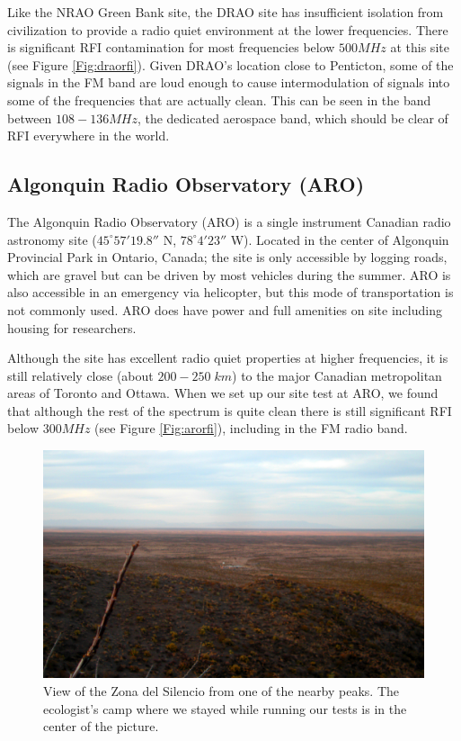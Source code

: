 Like the NRAO Green Bank site, the DRAO site has insufficient isolation from civilization to provide a radio quiet environment at the lower frequencies. There is significant RFI contamination for most frequencies below $500 MHz$ at this site (see Figure \ref{Fig:draorfi}). Given DRAO's location close to Penticton, some of the signals in the FM band are loud enough to cause intermodulation of signals into some of the frequencies that are actually clean. This can be seen in the band between $108-136 MHz$, the dedicated aerospace band, which should be clear of RFI everywhere in the world. 


\subsection{Algonquin Radio Observatory (ARO)}

The Algonquin Radio Observatory (ARO) is a single instrument Canadian radio astronomy site ($45^\circ 57' 19.8''$ N, $78^\circ 4' 23''$ W). Located in the center of Algonquin Provincial Park in Ontario, Canada; the site is only accessible by logging roads, which are gravel but can be driven by most vehicles during the summer. ARO is also accessible in an emergency via helicopter, but this mode of transportation is not commonly used. ARO does have power and full amenities on site including housing for researchers. 

Although the site has excellent radio quiet properties at higher frequencies, it is still relatively close (about $200-250 \; km$) to the major Canadian metropolitan areas of Toronto and Ottawa. When we set up our site test at ARO, we found that although the rest of the spectrum is quite clean there is still significant RFI below $300 MHz$ (see Figure \ref{Fig:arorfi}), including in the FM radio band. 


\begin{figure}[htb]
\begin{center}
\includegraphics[width=0.9\linewidth]{RFI_testing/figures/zds_overview_shot.jpg}
\caption{View of the Zona del Silencio from one of the nearby peaks. The ecologist's camp where we stayed while running our tests is in the center of the picture.}
\label{Fig:zdsover}
\end{center}
\end{figure}

